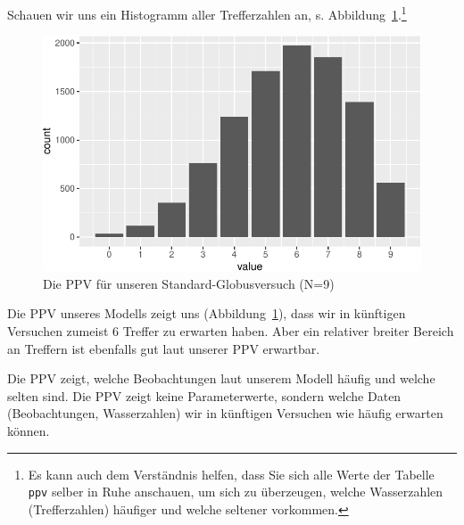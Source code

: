 \documentclass[
  a4paper,
  DIV=11]{scrreprt}
\theoremstyle{definition}
\theoremstyle{remark}
\begin{document}
Schauen wir uns ein Histogramm aller Trefferzahlen an, s.
Abbildung~\ref{fig-ppv2}.\footnote{Es kann auch dem Verständnis helfen,
  dass Sie sich alle Werte der Tabelle \texttt{ppv} selber in Ruhe
  anschauen, um sich zu überzeugen, welche Wasserzahlen (Trefferzahlen)
  häufiger und welche seltener vorkommen.}

\begin{figure}

{\centering \includegraphics{./ppv_files/figure-pdf/fig-ppv2-1.pdf}

}

\caption{\label{fig-ppv2}Die PPV für unseren Standard-Globusversuch
(N=9)}

\end{figure}

Die PPV unseres Modells zeigt uns (Abbildung~\ref{fig-ppv2}), dass wir
in künftigen Versuchen zumeist 6 Treffer zu erwarten haben. Aber ein
relativer breiter Bereich an Treffern ist ebenfalls gut laut unserer PPV
erwartbar.

\begin{tcolorbox}[enhanced jigsaw, left=2mm, colframe=quarto-callout-important-color-frame, opacityback=0, arc=.35mm, rightrule=.15mm, breakable, toptitle=1mm, colbacktitle=quarto-callout-important-color!10!white, colback=white, coltitle=black, bottomrule=.15mm, titlerule=0mm, opacitybacktitle=0.6, bottomtitle=1mm, title=\textcolor{quarto-callout-important-color}{\faExclamation}\hspace{0.5em}{Wichtig}, toprule=.15mm, leftrule=.75mm]
Die PPV zeigt, welche Beobachtungen laut unserem Modell häufig und
welche selten sind. Die PPV zeigt keine Parameterwerte, sondern welche
Daten (Beobachtungen, Wasserzahlen) wir in künftigen Versuchen wie
häufig erwarten können.
\end{tcolorbox}
\end{document}
